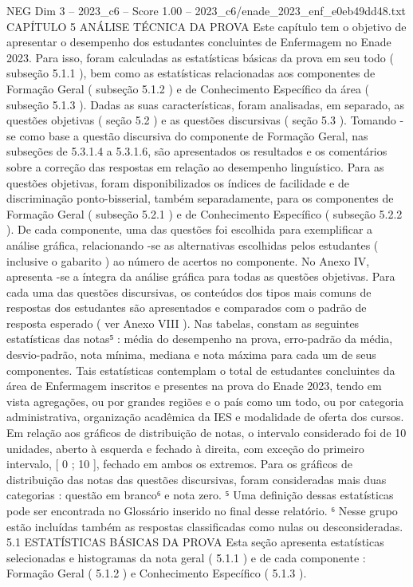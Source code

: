 \begin{textsample}{NEG Dim 3 – 2023\_c6 – Score 1.00 – 2023\_c6/enade\_2023\_enf\_e0eb49dd48.txt}  \label{ex:f3_neg_181}
CAPÍTULO 5 ANÁLISE TÉCNICA DA PROVA Este capítulo tem o objetivo de apresentar o desempenho dos estudantes concluintes de Enfermagem no Enade 2023.
Para isso, foram calculadas as estatísticas básicas da prova em seu todo ( subseção 5.1.1 ), bem como as estatísticas relacionadas aos componentes de Formação Geral ( subseção 5.1.2 ) e de Conhecimento Específico da área ( subseção 5.1.3 ).
Dadas as suas características, foram analisadas, em separado, as questões objetivas ( seção 5.2 ) e as questões discursivas ( seção 5.3 ).
Tomando -se como base a questão discursiva do componente de Formação Geral, nas subseções de 5.3.1.4 a 5.3.1.6, são apresentados os resultados e os comentários sobre a correção das respostas em relação ao desempenho linguístico.
Para as questões objetivas, foram disponibilizados os índices de facilidade e de discriminação ponto-bisserial, também separadamente, para os componentes de Formação Geral ( subseção 5.2.1 ) e de Conhecimento Específico ( subseção 5.2.2 ).
De cada componente, uma das questões foi escolhida para exemplificar a análise gráfica, relacionando -se as alternativas escolhidas pelos estudantes ( inclusive o gabarito ) ao número de acertos no componente.
No Anexo IV, apresenta -se a íntegra da análise gráfica para todas as questões objetivas.
Para cada uma das questões discursivas, os conteúdos dos tipos mais comuns de respostas dos estudantes são apresentados e comparados com o padrão de resposta esperado ( ver Anexo VIII ).
Nas tabelas, constam as seguintes estatísticas das notas⁵ : média do desempenho na prova, erro-padrão da média, desvio-padrão, nota mínima, mediana e nota máxima para cada um de seus componentes.
Tais estatísticas contemplam o total de estudantes concluintes da área de Enfermagem inscritos e presentes na prova do Enade 2023, tendo em vista agregações, ou por grandes regiões e o país como um todo, ou por categoria administrativa, organização acadêmica da IES e modalidade de oferta dos cursos.
Em relação aos gráficos de distribuição de notas, o intervalo considerado foi de 10 unidades, aberto à esquerda e fechado à direita, com exceção do primeiro intervalo, [ 0 ; 10 ], fechado em ambos os extremos.
Para os gráficos de distribuição das notas das questões discursivas, foram consideradas mais duas categorias : questão em branco⁶ e nota zero. ⁵ Uma definição dessas estatísticas pode ser encontrada no Glossário inserido no final desse relatório. ⁶ Nesse grupo estão incluídas também as respostas classificadas como nulas ou desconsideradas. 5.1 ESTATÍSTICAS BÁSICAS DA PROVA Esta seção apresenta estatísticas selecionadas e histogramas da nota geral ( 5.1.1 ) e de cada componente : Formação Geral ( 5.1.2 ) e Conhecimento Específico ( 5.1.3 ).

\end{textsample}
